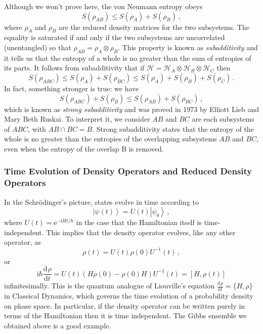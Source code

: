 \documentclass{article}
\theoremstyle{plain}\theoremheaderfont{\normalfont\itshape}\theorembodyfont{\rmfamily}\theoremseparator{.}\newtheorem*{rem}{Remark}\newtheorem*{ex}{Example}\newtheorem*{proof}{Proof}\newtheorem*{altp}{Alternative proof}
\theoremstyle{plain}\theoremheaderfont{\normalfont\bfseries}\theorembodyfont{\rmfamily}\theoremseparator{.}\newtheorem{thm}{Theorem}[section]\newtheorem{lem}[thm]{Lemma}\newtheorem{prop}[thm]{Proposition}\newtheorem*{cor}{Corollary}\newtheorem{defn}[thm]{Definition}\newtheorem{clm}[thm]{Claim}\newtheorem{clminproof}{Claim}
\theoremstyle{break}\theoremheaderfont{\normalfont\itshape}\theorembodyfont{\rmfamily}\theoremseparator{.\medskip}\newtheorem*{proofskip}{Proof}\newtheorem*{exs}{Examples}\newtheorem*{rems}{Remarks}
\theoremstyle{break}\theoremheaderfont{\normalfont\bfseries}\theorembodyfont{\rmfamily}\theoremseparator{.\medskip}\newtheorem{lemskip}[thm]{Lemma}\newtheorem{defnskip}[thm]{Definition}\newtheorem{propskip}[thm]{Proposition}\newtheorem{thmskip}[thm]{Theorem}
\numberwithin{equation}{section}
\newcommand{\ii}{\mathrm{i}}
\newcommand{\ee}{\mathrm{e}}
\newcommand{\dv}[3][]{\frac{\mathrm{d}^{#1} #2}{{\mathrm{d} #3}^{#1}}}
\newcommand{\ket}[1]{\left| #1 \right\rangle}
\newcommand{\hb}{\mathcal{H}}
\begin{document}
    Although we won't prove here, the von Neumann entropy obeys
    \begin{equation}
        S(\rho_{AB})\le S(\rho_A)+S(\rho_B)\,,
    \end{equation}
    where \(\rho_A\) and \(\rho_B\) are the reduced density matrices for the two subsystems. The equality is saturated if and only if the two subsystems are uncorrelated (unentangled) so that \(\rho_{AB}=\rho_A\otimes\rho_B\). This property is known as \textit{subadditivity} and it tells us that the entropy of a whole is no greater than the sum of entropies of its parts. It follows from subadditivity that if \(\hb=\hb_{A}\otimes\hb_B\otimes\hb_C\) then
    \begin{equation}
        S(\rho_{ABC})\le S(\rho_A)+S(\rho_{BC})\le S(\rho_A)+S(\rho_B)+S(\rho_C)\,.
    \end{equation}
    In fact, something stronger is true: we have
    \begin{equation}
        S(\rho_{ABC})+S(\rho_B)\le S(\rho_{AB})+S(\rho_{BC})\,,
    \end{equation}
    which is known as \textit{strong subadditivity} and was proved in 1973 by Elliott Lieb and Mary Beth Ruskai. To interpret it, we consider \(AB\) and \(BC\) are each subsystems of \(ABC\), with \(AB\cap BC = B\). Strong subadditivity states that the entropy of the whole is no greater than the entropies of the overlapping subsystems \(AB\) and \(BC\), even when the entropy of the overlap B is removed.

    \subsubsection{Time Evolution of Density Operators and Reduced Density Operators}
    In the Schr\"{o}dinger's picture, states evolve in time according to
    \begin{equation}
        \ket{\psi(t)}=U(t)\ket{\psi_0}\,,
    \end{equation}
    where \(U(t)=\ee^{-\ii Ht/\hbar}\) in the case that the Hamiltonian itself is time-independent. This implies that the density operator evolves, like any other operator, as
    \begin{equation}
        \rho(t)=U(t)\rho(0)U^{-1}(t)\,,
    \end{equation}
    or
    \begin{equation}\label{quantum_liouville}
        \ii\hbar\dv{\rho}{t}=U(t)(H\rho(0)-\rho(0)H)U^{-1}(t)=[H,\rho(t)]
    \end{equation}
    infinitesimally. This is the quantum analogue of Liouville's equation \(\dv{\rho}{t}=\{H,\rho\}\) in Classical Dynamics, which governs the time evolution of a probability density on phase space. In particular, if the density operator can be written purely in terms of the Hamiltonian then it is time independent. The Gibbs ensemble we obtained above is a good example.
\end{document}
